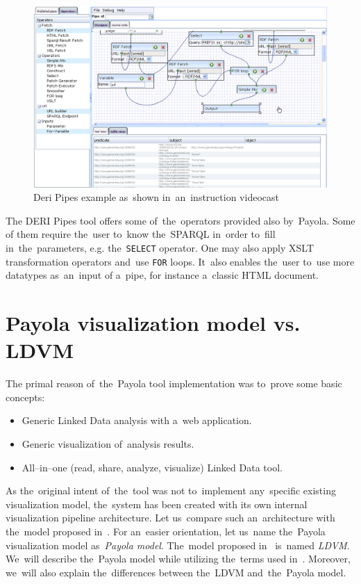 \begin{figure}
	\centering
	\includegraphics[width=140mm]{img/deri.png}
	\caption{Deri Pipes example as~shown in~an~instruction videocast~\cite{deri-screen-source}}
	\label{fig:deri}
\end{figure}

The DERI Pipes tool offers some of~the~operators provided also by~Payola. Some 
of them require the~user to~know the~SPARQL in~order to~fill in~the~parameters, e.g. the~\texttt{SELECT} operator. One may also apply XSLT 
transformation operators and~use \texttt{FOR} loops. It~also enables the~user to~use more datatypes as~an~input 
of a~pipe, for instance a~classic HTML document.

\section{Payola visualization model vs. LDVM}
\label{sec:rw:ldvm}
The primal reason of~the~Payola tool implementation was to~prove some basic concepts:

\begin{itemize}
\item Generic Linked Data analysis with a~web application.
\item Generic visualization of~analysis results.
\item All--in--one (read, share, analyze, visualize) Linked Data tool.
\end{itemize}

As the~original intent of~the~tool was not to~implement any~specific existing visualization model,
the~system has been created with its own internal visualization pipeline architecture. Let us~compare such
an~architecture with the~model proposed in~\cite{ldvm}. For an~easier orientation, let us~name the~Payola visualization 
model as~\emph{Payola model}. The~model proposed in~\cite{ldvm} is~named \emph{LDVM}. We~will describe the~Payola
model while utilizing the~terms used in~\cite{ldvm}. Moreover, we~will also explain
the~differences between the~LDVM and~the~Payola model.

